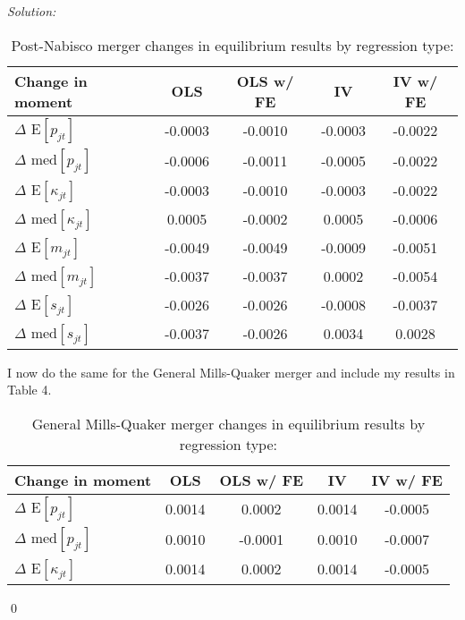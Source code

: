 \documentclass[12pt]{article}
\newenvironment{sol}
    {\emph{Solution:}
    }
    {
    \qed
    }
\begin{document}
\begin{sol}
\begin{center}
    \begin{table}[htbp]
        \centering
        \caption{Post-Nabisco merger changes in equilibrium results by regression type:}
          \begin{tabular}{lcccc}
              \toprule
                Change in moment    & OLS          & OLS w/ FE & IV & IV w/ FE         \\
              \midrule
                $\Delta$ E$[p_{jt}]$       &-0.0003&-0.0010&-0.0003&-0.0022\\
                $\Delta$ med$[p_{jt}]$      &-0.0006&-0.0011&-0.0005&-0.0022   \\
                \midrule
                $\Delta$ E$[\kappa_{jt}]$   &-0.0003&-0.0010&-0.0003&-0.0022\\
                $\Delta$ med$[\kappa_{jt}]$ &0.0005 &-0.0002&0.0005 & -0.0006 \\
                \midrule
                $\Delta$ E$[m_{jt}]$        &-0.0049&-0.0049&-0.0009&-0.0051\\
                $\Delta$ med$[m_{jt}]$      &-0.0037&-0.0037&0.0002 &-0.0054  \\
                 \midrule
                $\Delta$  E$[s_{jt}]$      &-0.0026&-0.0026&-0.0008&-0.0037 \\
                $\Delta$ med$[s_{jt}]$     &-0.0037&-0.0026&0.0034 &0.0028   \\
              \bottomrule
          \end{tabular}
        \label{tab:pn_merger}
      \end{table}
\end{center}
I now do the same for the General Mills-Quaker merger and include my results in Table 4.
\begin{center}
    \begin{table}[htbp]
        \centering
        \caption{General Mills-Quaker merger changes in equilibrium results by regression type:}
          \begin{tabular}{lcccc}
              \toprule
                Change in moment    & OLS          & OLS w/ FE & IV & IV w/ FE         \\
              \midrule
                $\Delta$ E$[p_{jt}]$       &0.0014 &0.0002 &0.0014 &-0.0005\\
                $\Delta$ med$[p_{jt}]$      &0.0010 &-0.0001&0.0010 &-0.0007\\
                \midrule
                $\Delta$ E$[\kappa_{jt}]$   &0.0014 &0.0002 &0.0014 &-0.0005\\

\end{tabular}
\end{table}
\end{center}
\end{sol}
\end{document}
